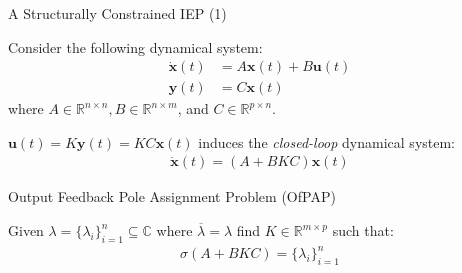 \documentclass[handout]{beamer}
\begin{document}
\begin{frame}{A Structurally Constrained IEP (1)}

  Consider the following dynamical system:
  \begin{align*}
    \dot{\mathbf{x}}(t) &= A \mathbf{x}(t) + B \mathbf{u}(t)\\
    \mathbf{y}(t) &= C \mathbf{x}(t)
  \end{align*}
  where $A \in \mathbb{R}^{n \times n}, B \in \mathbb{R}^{n \times m}$, and $C \in \mathbb{R}^{p \times n}$.

  \pause

  \vspace{5pt}

  $\mathbf{u}(t) = K \mathbf{y}(t) = K C \mathbf{x}(t)$ induces the \emph{closed-loop} dynamical system:
  \begin{align*}
    \dot{ \mathbf{x} }(t) = ( A + B K C ) \mathbf{x}(t)
  \end{align*}

  \pause

  \begin{titled-frame}{Output Feedback Pole Assignment Problem (OfPAP)}

    Given $\lambda = \{ \lambda_i \}_{i = 1}^{n} \subseteq \mathbb{C}$ where $\overline{\lambda} = \lambda$ find $K \in \mathbb{R}^{m \times p}$ such that:
    \begin{align*}
      \sigma \left( A + B K C \right) = \{ \lambda_i \}_{i = 1}^{n}
    \end{align*}

  \end{titled-frame}

\end{frame}
\end{document}
